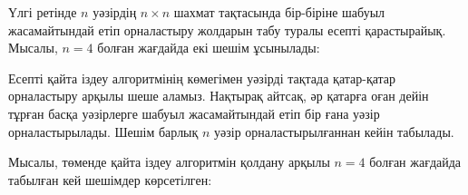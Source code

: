 
Үлгі ретінде $n$ уәзірдің $n \times n$ шахмат тақтасында 
бір-біріне шабуыл жасамайтындай етіп орналастыру жолдарын табу туралы есепті   
қарастырайық. Мысалы, $n=4$ болған жағдайда екі шешім ұсынылады:

\begin{center}
\end{center}

Есепті қайта іздеу алгоритмінің көмегімен 
уәзірді тақтада қатар-қатар орналастыру арқылы
шеше аламыз. Нақтырақ айтсақ, әр қатарға
оған дейін тұрған басқа уәзірлерге шабуыл
жасамайтындай етіп бір ғана уәзір орналастырылады.
Шешім барлық $n$ уәзір орналастырылғаннан кейін
табылады. 

Мысалы, төменде қайта іздеу алгоритмін қолдану арқылы $n=4$ болған жағдайда табылған
кей шешімдер көрсетілген:

